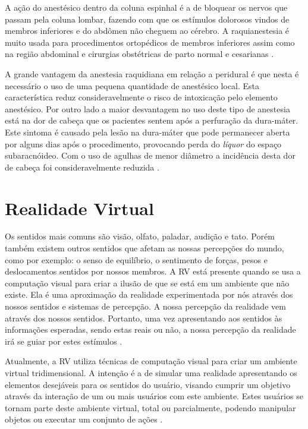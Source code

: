 A ação do anestésico dentro da coluna espinhal é a de bloquear os nervos que passam pela coluna lombar, fazendo com que os estímulos dolorosos vindos de membros inferiores e do abdômen não cheguem ao cérebro. A raquianestesia é muito usada para procedimentos ortopédicos de membros inferiores assim como na região abdominal e cirurgias obstétricas de parto normal e cesarianas \cite{Pinheiro2018}.

A grande vantagem da anestesia raquidiana em relação a peridural é que nesta é necessário o uso de uma pequena quantidade de anestésico local. Esta característica reduz consideravelmente o risco de intoxicação pelo elemento anestésico. Por outro lado a maior desvantagem no uso deste tipo de anestesia está na dor de cabeça que os pacientes sentem após a perfuração da dura-máter. Este sintoma é causado pela lesão na dura-máter que pode permanecer aberta por alguns dias após o procedimento, provocando perda do \textit{líquor} do espaço subaracnóideo. Com o uso de agulhas de menor diâmetro a incidência desta dor de cabeça foi consideravelmente reduzida \cite{INFOESCOLA2018}. 

\section{Realidade Virtual}

Os sentidos mais comuns são visão, olfato, paladar, audição e tato. Porém também existem outros sentidos que afetam as nossas percepções do mundo, como por exemplo: o senso de equilíbrio, o sentimento de forças, pesos e deslocamentos sentidos por nossos membros. A \acrfull{RV} está presente quando se usa a computação visual para criar a ilusão de que se está em um ambiente que não existe. Ela é uma aproximação da realidade experimentada por nós através dos nossos sentidos e sistemas de percepção. A nossa percepção da realidade vem através dos nossos sentidos. Portanto, uma vez apresentando aos sentidos às informações esperadas, sendo estas reais ou não, a nossa percepção da realidade irá se guiar por estes estímulos \cite{VRS2018}.

Atualmente, a \acrshort{RV} utiliza técnicas de computação visual para criar um ambiente virtual tridimensional. A intenção é a de simular uma realidade apresentando os elementos desejáveis para os sentidos do usuário, visando cumprir um objetivo através da interação de um ou mais usuários com este ambiente. Estes usuários se tornam parte deste ambiente virtual, total ou parcialmente, podendo manipular objetos ou executar um conjunto de ações \cite{VRS2018}.

